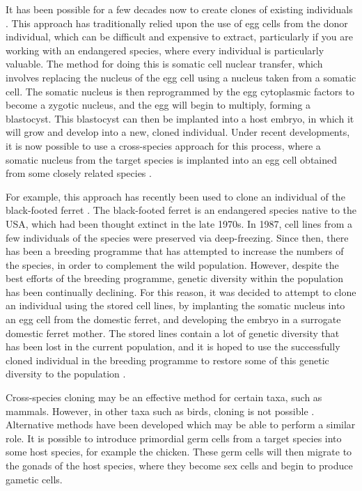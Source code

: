 \documentclass[10pt]{article}
\begin{document}
	It has been possible for a few decades now to create clones of existing individuals \cite{campbellSheepClonedNuclear1996}.
	This approach has traditionally relied upon the use of egg cells from the donor
	individual, which can be difficult and expensive to extract, particularly if you are
	working with an endangered species, where every individual is particularly valuable.
	The method for doing this is somatic cell nuclear transfer, which involves replacing
	the nucleus of the egg cell using a nucleus taken from a somatic cell. The somatic
	nucleus is then reprogrammed by the egg cytoplasmic factors to become a zygotic nucleus,
	and the egg will begin to multiply, forming a blastocyst. This blastocyst can then be
	implanted into a host embryo, in which it will grow and develop into a new, cloned
	individual. Under recent developments, it is now possible to use a cross-species
	approach for this process, where a somatic nucleus from the target species is
	implanted into an egg cell obtained from some closely related species \cite{loiGeneticRescueEndangered2001}.
	
	For example, this approach has recently been used to clone an individual of the black-footed ferret \cite{ConservationFirstCloned, wiselyRoadMap21st2015, sandlerEthicalAnalysisCloning2021}. The black-footed ferret is an endangered species native to the 
	USA, which had been thought extinct in the late 1970s. In 1987, cell lines from a few
	individuals of the species were preserved via deep-freezing. Since then, there has been
	a breeding programme that has attempted to increase the numbers of the species, in order
	to complement the wild population. However, despite the best efforts of the breeding
	programme, genetic diversity within the population has been continually declining. For
	this reason, it was decided to attempt to clone an individual using the stored cell
	lines, by implanting the somatic nucleus into an egg cell from the domestic ferret, 
	and developing the embryo in a surrogate domestic ferret mother. The stored lines contain
	a lot of genetic diversity that has been lost in the current population, and it is hoped
	to use the successfully cloned individual in the breeding programme to restore some of
	this genetic diversity to the population \cite{ConservationFirstCloned}.
	
	Cross-species cloning may be an effective method for certain taxa, such as mammals.
	However, in other taxa such as birds, cloning is not possible \cite{ConservationFirstCloned}. Alternative methods
	have been developed which may be able to perform a similar role. It is possible to 
	introduce primordial germ cells from a target species into some host species, for
	example the chicken. These germ cells will then migrate to the gonads of the host
	species, where they become sex cells and begin to produce gametic cells.
	
\end{document}
